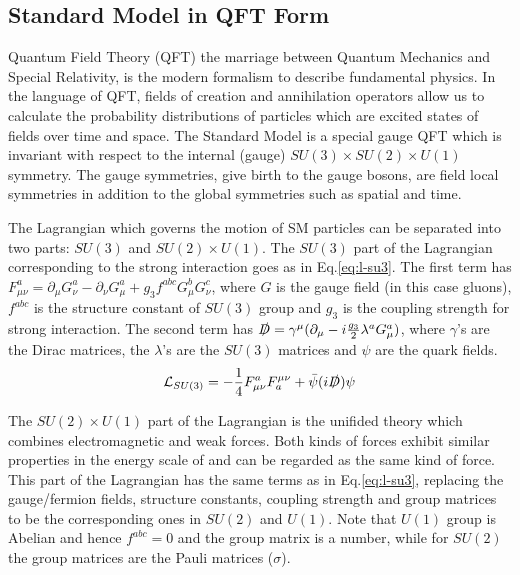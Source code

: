 \subsection{Standard Model in QFT Form}

Quantum Field Theory (QFT) the marriage between Quantum Mechanics and Special Relativity, is the modern formalism to describe fundamental physics. In the language of QFT, fields of creation and annihilation operators allow us to calculate the probability distributions of particles which are excited states of fields over time and space. The Standard Model is a special gauge QFT which is invariant with respect to the internal (gauge) $SU(3)\times SU(2)\times U(1)$ symmetry. The gauge symmetries, give birth to the gauge bosons, are field local symmetries in addition to the global symmetries such as spatial and time. 

The Lagrangian which governs the motion of SM particles can be separated into two parts: $SU(3)$ and $SU(2)\times U(1)$. The $SU(3)$ part of the Lagrangian corresponding to the strong interaction goes as in Eq.\ref{eq:l-su3}. The first term has $F^{a}_{\mu\nu}  = \partial_{\mu}G^a_{\nu}-\partial_{\nu}G^a_{\mu}+g_3f^{abc}G^b_{\mu}G^c_{\nu}$, where $G$ is the gauge field (in this case gluons), $f^{abc}$ is the structure constant of $SU(3)$ group and $g_3$ is the coupling strength for strong interaction. The second term has $\slashed{D} = \gamma^{\mu}(\partial_{\mu}- i\frac{g_3}{2}\lambda^aG^a_{\mu})$, where $\gamma$'s are the Dirac matrices, the $\lambda$'s are the $SU(3)$ matrices and $\psi$ are the quark fields. 
\begin{equation}
  \mathcal{L}_{SU(3)} = -\frac{1}{4}F^{a}_{\mu\nu}F_{a}^{\mu\nu}+ \bar{\psi}(i\slashed{D}) \psi
  \label{eq:l-su3}
\end{equation}

The $SU(2)\times U(1)$ part of the Lagrangian is the unifided theory which combines electromagnetic and weak forces. Both kinds of forces exhibit similar properties in the energy scale of \GeV and can be regarded as the same kind of force. This part of the Lagrangian has the same terms as in Eq.\ref{eq:l-su3}, replacing the gauge/fermion fields, structure constants, coupling strength and group matrices to be the corresponding ones in $SU(2)$ and $U(1)$. Note that $U(1)$ group is Abelian and hence $f^{abc}=0$ and the group matrix is a number, while for $SU(2)$ the group matrices are the Pauli matrices ($\sigma$). 
